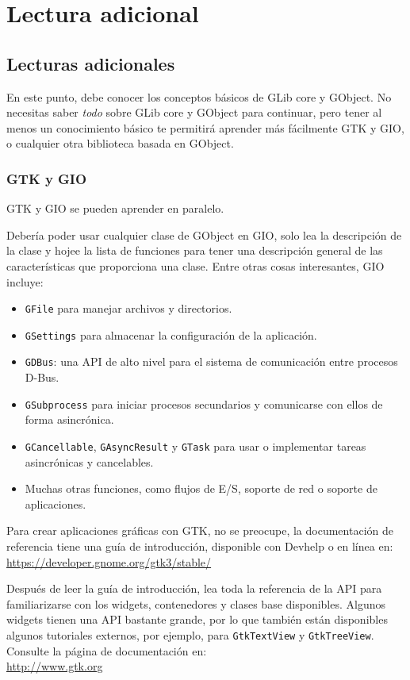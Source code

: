 \part{Lectura adicional \label{further-reading}}

\chapter{Lecturas adicionales}

En este punto, debe conocer los conceptos básicos de GLib core y GObject. No necesitas saber \emph{todo} sobre GLib core y GObject para continuar, pero tener al menos un conocimiento básico te permitirá aprender más fácilmente GTK y GIO, o cualquier otra biblioteca basada en GObject.

\section{GTK y GIO}
GTK y GIO se pueden aprender en paralelo.

Debería poder usar cualquier clase de GObject en GIO, solo lea la descripción de la clase y hojee la lista de funciones para tener una descripción general de las características que proporciona una clase. Entre otras cosas interesantes, GIO incluye:
\begin{itemize}
  \item \lstinline{GFile} para manejar archivos y directorios.
  \item \lstinline{GSettings} para almacenar la configuración de la aplicación.
  \item \lstinline{GDBus}: una API de alto nivel para el sistema de comunicación entre procesos D-Bus.
  \item \lstinline{GSubprocess} para iniciar procesos secundarios y comunicarse con ellos de forma asincrónica.
  \item \lstinline{GCancellable}, \lstinline{GAsyncResult} y \lstinline{GTask} para usar o implementar tareas asincrónicas y cancelables.
  \item Muchas otras funciones, como flujos de E/S, soporte de red o soporte de aplicaciones.
\end{itemize}

Para crear aplicaciones gráficas con GTK, no se preocupe, la documentación de referencia tiene una guía de introducción, disponible con Devhelp o en línea en: \\
\url{https://developer.gnome.org/gtk3/stable/}

Después de leer la guía de introducción, lea toda la referencia de la API para familiarizarse con los widgets, contenedores y clases base disponibles. Algunos widgets tienen una API bastante grande, por lo que también están disponibles algunos tutoriales externos, por ejemplo, para \lstinline{GtkTextView} y \lstinline{GtkTreeView}. Consulte la página de documentación en: \\
\url{http://www.gtk.org}

